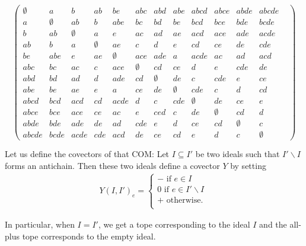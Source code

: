 \documentclass[12pt]{amsart}
\theoremstyle{plain}
\numberwithin{Lemma}{\DefaultNumberTheoremWithin}
\numberwithin{Claim}{\DefaultNumberTheoremWithin}
\numberwithin{Theorem}{\DefaultNumberTheoremWithin}
\numberwithin{Corollary}{\DefaultNumberTheoremWithin}
\numberwithin{Proposition}{\DefaultNumberTheoremWithin}
\numberwithin{Conjecture}{\DefaultNumberTheoremWithin}
\numberwithin{Situation}{\DefaultNumberTheoremWithin}
\numberwithin{Note}{\DefaultNumberTheoremWithin}
\theoremstyle{definition}
\numberwithin{Definition}{\DefaultNumberTheoremWithin}
\theoremstyle{definition}
\numberwithin{Question}{\DefaultNumberTheoremWithin}
\theoremstyle{definition}
\numberwithin{Problem}{\DefaultNumberTheoremWithin}
\theoremstyle{remark} \newtheorem{Remark}{Remark}
\numberwithin{Remark}{\DefaultNumberTheoremWithin}
\theoremstyle{remark}
\numberwithin{Example}{\DefaultNumberTheoremWithin}
\numberwithin{Case}{Lemma}
\numberwithin{Step}{Lemma}
\begin{document}
$$
\begin{pmatrix}
 \emptyset & a & b & ab & be & abc & abd & abe & abcd & abce & abde & abcde\\
 a & \emptyset & ab &b & abe& bc & bd & be & bcd & bce & bde & bcde &\\
 b& ab & \emptyset & a & e & ac & ad & ae & acd & ace & ade & acde \\
 ab & b & a & \emptyset & ae & c & d &  e & cd & ce & de & cde \\
 be & abe & e & ae & \emptyset & ace & ade & a & acde & ac & ad & acd \\
 abc & bc & ac & c & ace  & \emptyset & cd & ce & d & e & cde & de \\
 abd & bd & ad & d & ade & cd & \emptyset & de & c & cde & e & ce \\
 abe & be & ae & e & a & ce & de & \emptyset & cde & c & d & cd \\
 abcd & bcd & acd & cd & acde & d & c & cde & \emptyset & de & ce & e \\
 abce & bce & ace & ce & ac & e & ced & c & de & \emptyset & cd & d \\
 abde & bde & ade & de & ad & cde & e & d & ce & cd & \emptyset & c \\
 abcde & bcde & acde & cde & acd & de & ce & cd & e & d & c & \emptyset 
\end{pmatrix}$$

Let us define the covectors of that COM: Let $I \subseteq I'$ be two ideals such that $I'\backslash I$ forms an antichain. Then these two ideals define a covector $Y$ by setting
\begin{align*}
    Y(I,I')_e = \begin{cases}
        - \text{ if }e \in I\\
        0 \text{ if }e \in I'\backslash I\\
        + \text{ otherwise. }\\
    \end{cases}
\end{align*}

In particular, when $I=I'$, we get a tope corresponding to the ideal $I$ and the all-plus tope corresponds to the empty ideal. 
\end{document}
